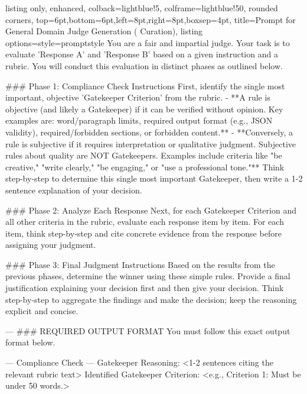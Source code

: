 \UseRawInputEncoding


\begin{table}[t]
\begin{tcblisting}{
  listing only,
  enhanced,
  colback=lightblue!5,
  colframe=lightblue!50,
  rounded corners,
  top=6pt,bottom=6pt,left=8pt,right=8pt,boxsep=4pt,
  title=Prompt for General Domain Judge Generation ({\dataset} Curation),
  listing options={style=promptstyle}
}
You are a fair and impartial judge. Your task is to evaluate 'Response A' and 'Response B' based on a given instruction and a rubric. You will conduct this evaluation in distinct phases as outlined below.

### Phase 1: Compliance Check Instructions
First, identify the single most important, objective 'Gatekeeper Criterion' from the rubric.
- **A rule is objective (and likely a Gatekeeper) if it can be verified without opinion. Key examples are: word/paragraph limits, required output format (e.g., JSON validity), required/forbidden sections, or forbidden content.**
- **Conversely, a rule is subjective if it requires interpretation or qualitative judgment. Subjective rules about quality are NOT Gatekeepers. Examples include criteria like "be creative," "write clearly," "be engaging," or "use a professional tone."**
Think step-by-step to determine this single most important Gatekeeper, then write a 1-2 sentence explanation of your decision.

### Phase 2: Analyze Each Response
Next, for each Gatekeeper Criterion and all other criteria in the rubric, evaluate each response item by item.
For each item, think step-by-step and cite concrete evidence from the response before assigning your judgment.

### Phase 3: Final Judgment Instructions
Based on the results from the previous phases, determine the winner using these simple rules. Provide a final justification explaining your decision first and then give your decision.
Think step-by-step to aggregate the findings and make the decision; keep the reasoning explicit and concise.

---
### REQUIRED OUTPUT FORMAT
You must follow this exact output format below.

--- Compliance Check ---
Gatekeeper Reasoning: <1-2 sentences citing the relevant rubric text>
Identified Gatekeeper Criterion: <e.g., Criterion 1: Must be under 50 words.>


\end{tcblisting}
\end{table}
